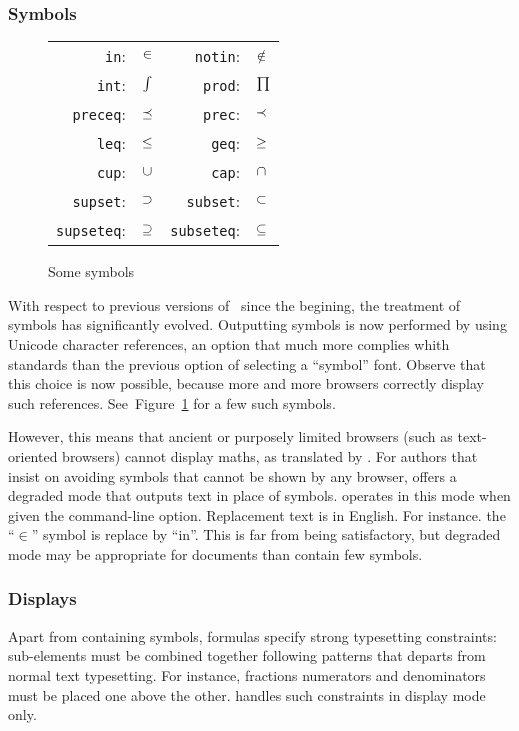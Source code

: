 \subsubsection{Symbols}\label{symbols}
\begin{figure}[ht]
\caption{\label{symbol:fig}Some symbols}
\def\zyva#1{\texttt{\char92{}#1}:\quad & \Large $\csname#1\endcsname$}
\begin{center}
\begin{tabular}{rl@{\qquad}rl}
\zyva{in} & \zyva{notin}\\
\zyva{int} & \zyva{prod}\\
\zyva{preceq} & \zyva{prec}\\
\zyva{leq}    & \zyva{geq}\\
\zyva{cup} & \zyva{cap}\\
\zyva{supset} & \zyva{subset}\\
\zyva{supseteq} & \zyva{subseteq}\\
\end{tabular}
\end{center}
\end{figure}
With respect to previous versions of~\hevea{} since the begining, the
treatment of symbols has significantly evolved.  Outputting symbols is
now performed by using Unicode character references, an option that
much more complies whith standards than the previous option of
selecting a ``symbol'' font.  Observe that this choice is now
possible, because more and more browsers correctly display such
references. See~Figure~\ref{symbol:fig} for a few such symbols.



However, this means that ancient or purposely limited browsers (such as
text-oriented browsers) cannot display maths, as translated by \hevea.
For authors that insist on avoiding symbols that cannot be shown
by any browser, \hevea{} offers a degraded mode that outputs text
in place of symbols.
\hevea{} operates in this mode when given the 
command-line option. Replacement text is in English.
For instance. the ``$\in$'' symbol is replace by ``in''.
This is far from being satisfactory, but degraded mode may be
appropriate for documents than contain few symbols.


\subsubsection{Displays}
Apart from containing symbols, formulas specify strong typesetting
constraints: sub-elements must be combined together following patterns
that departs from normal text typesetting. For instance, fractions
numerators and denominators must be placed one above the other.
\hevea{} handles such constraints in display mode only.


